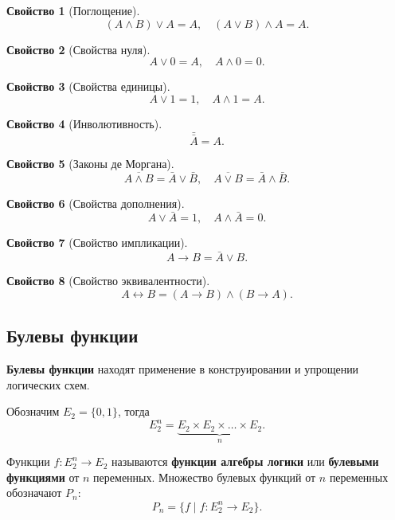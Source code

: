 \documentclass[a5paper, 11pt]{extarticle}
\theoremstyle{definition}
\newtheorem{property}{Свойство}[subsection]
\theoremstyle{definition}
\theoremstyle{definition}
\numberwithin{figure}{section}
\numberwithin{table}{section}
\begin{document}
\begin{property}[Поглощение]
    \[
        (A \land B) \lor A = A,
        \quad
        (A \lor B) \land A = A.
    \]
\end{property}

\begin{property}[Свойства нуля]
    \[
        A \lor 0 = A,
        \quad
        A \land 0 = 0.
    \]
\end{property}

\begin{property}[Свойства единицы]
    \[
        A \lor 1 = 1,
        \quad
        A \land 1 = A.
    \]
\end{property}

\begin{property}[Инволютивность]
    \[
        \bar{\bar{A}} = A.
    \]
\end{property}

\begin{property}[Законы де Моргана]
    \[
        \overline{A \land B} = \bar{A} \lor \bar{B},
        \quad
        \overline{A \lor B} = \bar{A} \land \bar{B}.
    \]
\end{property}

\begin{property}[Свойства дополнения]
    \[
        A \lor \bar{A} = 1,
        \quad
        A \land \bar{A} = 0.
    \]
\end{property}

\begin{property}[Свойство импликации]
    \[
        A \to B = \bar{A} \lor B.
    \]
\end{property}

\begin{property}[Свойство эквивалентности]
    \[
        A \leftrightarrow B = (A \to B) \land (B \to A).
    \]
\end{property}

\subsection{Булевы функции}

\textbf{Булевы функции} находят применение в конструировании и упрощении логических схем.

Обозначим \(E_2 = \{0, 1\}\), тогда
\[
    E_2^n = \underbrace{E_2 \times E_2 \times \ldots \times E_2}_{n}.
\]

Функции \(f: E_2^n \to E_2\) называются \textbf{функции алгебры логики} или \textbf{булевыми функциями} от \(n\) переменных. Множество булевых функций от \(n\) переменных обозначают \(P_n\):
\[
    P_n = \{f \mid f : E_2^n \to E_2\}.
\]
\end{document}

